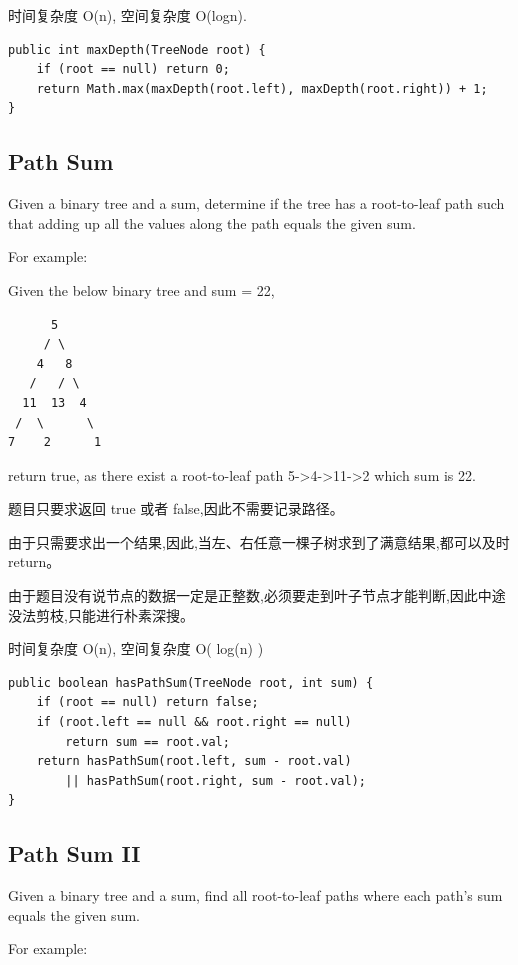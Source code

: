 \documentclass[12pt]{book}
\begin{document}
时间复杂度 O(n), 空间复杂度 O(logn). 

\lstset{language=java,label= ,caption= ,numbers=none}
\begin{lstlisting}
public int maxDepth(TreeNode root) {
    if (root == null) return 0;
    return Math.max(maxDepth(root.left), maxDepth(root.right)) + 1;
}
\end{lstlisting}

\subsection{Path Sum}
\label{sec-4-5-3}
Given a binary tree and a sum, determine if the tree has a root-to-leaf path such that adding up all the values along the path equals the given sum.

For example:

Given the below binary tree and sum = 22,
\lstset{language=java,label= ,caption= ,numbers=none}
\begin{lstlisting}
      5
     / \
    4   8
   /   / \
  11  13  4
 /  \      \
7    2      1
\end{lstlisting}

return true, as there exist a root-to-leaf path 5->4->11->2 which sum is 22.

题目只要求返回 true 或者 false,因此不需要记录路径。

由于只需要求出一个结果,因此,当左、右任意一棵子树求到了满意结果,都可以及时 return。

由于题目没有说节点的数据一定是正整数,必须要走到叶子节点才能判断,因此中途没法剪枝,只能进行朴素深搜。

时间复杂度 O(n), 空间复杂度 O( log(n) )

\lstset{language=java,label= ,caption= ,numbers=none}
\begin{lstlisting}
public boolean hasPathSum(TreeNode root, int sum) {
    if (root == null) return false;
    if (root.left == null && root.right == null)
        return sum == root.val;
    return hasPathSum(root.left, sum - root.val)
        || hasPathSum(root.right, sum - root.val);
}
\end{lstlisting}

\subsection{Path Sum II}
\label{sec-4-5-4}
Given a binary tree and a sum, find all root-to-leaf paths where each path's sum equals the given sum.

For example:
\end{document}
